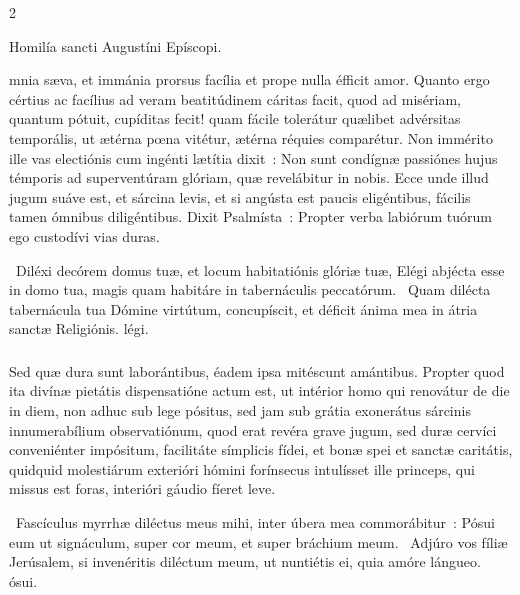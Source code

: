 \documentclass[9pt,twoside]{extarticle}
\begin{document}
\begin{multicols}{2}
{\begin{center}Homilía sancti Augustíni Epíscopi.\\
\end{center}
mnia sæva, et immánia prorsus facília et prope nulla éfficit amor. Quanto ergo cértius ac facílius ad veram beatitúdinem cáritas facit, quod ad misériam, quantum pótuit, cupíditas fecit! quam fácile tolerátur quælibet advérsitas temporális, ut ætérna pœna vitétur, ætérna réquies comparétur. Non immérito ille vas electiónis cum ingénti lætítia dixit~: Non sunt condígnæ passiónes hujus témporis ad superventúram glóriam, quæ revelábitur in nobis. Ecce unde illud jugum suáve est, et sárcina levis, et si angústa est paucis eligéntibus, fácilis tamen ómnibus diligéntibus. Dixit Psalmísta~: Propter verba labiórum tuórum ego custodívi vias duras.

\begin{tightlist}{}
\item {}~Diléxi decórem domus tuæ, et locum habitatiónis glóriæ tuæ, \textred{*} Elégi abjécta esse in domo tua, magis quam habitáre in tabernáculis peccatórum. ~Quam dilécta tabernácula tua Dómine virtútum, concupíscit, et déficit ánima mea in átria sanctæ Religiónis. légi.
\end{tightlist}

\subsubsection*{\center {}}
Sed quæ dura sunt laborántibus, éadem ipsa mitéscunt amántibus. Propter quod ita divínæ pietátis dispensatióne actum est, ut intérior homo qui renovátur de die in diem, non adhuc sub lege pósitus, sed jam sub grátia exonerátus sárcinis innumerabílium observatiónum, quod erat revéra grave jugum, sed duræ cervíci conveniénter impósitum, facilitáte símplicis fídei, et bonæ spei et sanctæ caritátis, quidquid molestiárum exterióri hómini forínsecus intulísset ille princeps, qui missus est foras, interióri gáudio fíeret leve.

\begin{tightlist}{}
\item {}~Fascículus myrrhæ diléctus meus mihi, inter úbera mea commorábitur~: \textred{*} Pósui eum ut signáculum, super cor meum, et super bráchium meum. ~Adjúro vos fíliæ Jerúsalem, si invenéritis diléctum meum, ut nuntiétis ei, quia amóre lángueo. ósui.
\end{tightlist}

}
\end{multicols}
\end{document}

